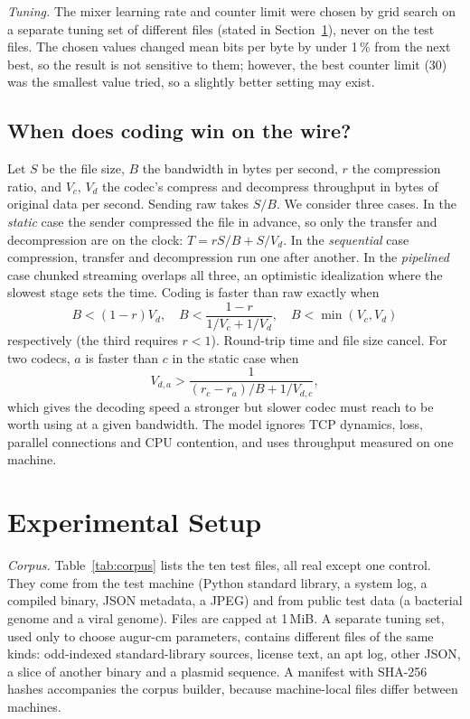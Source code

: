 \documentclass[conference]{IEEEtran}
\newcommand{\cm}{\textsf{augur-cm}}
\begin{document}
\emph{Tuning.} The mixer learning rate and counter limit were chosen by grid search on a separate tuning set of different files (stated in Section~\ref{sec:setup}), never on the test files. The chosen values changed mean bits per byte by under 1\,\% from the next best, so the result is not sensitive to them; however, the best counter limit (30) was the smallest value tried, so a slightly better setting may exist.

\subsection{When does coding win on the wire?}\label{sec:model}
Let $S$ be the file size, $B$ the bandwidth in bytes per second, $r$ the compression ratio, and $V_c$, $V_d$ the codec's compress and decompress throughput in bytes of original data per second. Sending raw takes $S/B$. We consider three cases. In the \emph{static} case the sender compressed the file in advance, so only the transfer and decompression are on the clock: $T=rS/B+S/V_d$. In the \emph{sequential} case compression, transfer and decompression run one after another. In the \emph{pipelined} case chunked streaming overlaps all three, an optimistic idealization where the slowest stage sets the time. Coding is faster than raw exactly when
\begin{equation}
B<(1-r)V_d,\quad B<\frac{1-r}{1/V_c+1/V_d},\quad B<\min(V_c,V_d)
\label{eq:be}
\end{equation}
respectively (the third requires $r<1$). Round-trip time and file size cancel. For two codecs, $a$ is faster than $c$ in the static case when
\begin{equation}
V_{d,a}>\frac{1}{(r_c-r_a)/B+1/V_{d,c}},
\label{eq:need}
\end{equation}
which gives the decoding speed a stronger but slower codec must reach to be worth using at a given bandwidth. The model ignores TCP dynamics, loss, parallel connections and CPU contention, and uses throughput measured on one machine.

\section{Experimental Setup}\label{sec:setup}
\emph{Corpus.} Table~\ref{tab:corpus} lists the ten test files, all real except one control. They come from the test machine (Python standard library, a system log, a compiled binary, JSON metadata, a JPEG) and from public test data (a bacterial genome and a viral genome). Files are capped at 1\,MiB. A separate tuning set, used only to choose \cm{} parameters, contains different files of the same kinds: odd-indexed standard-library sources, license text, an apt log, other JSON, a slice of another binary and a plasmid sequence. A manifest with SHA-256 hashes accompanies the corpus builder, because machine-local files differ between machines.
\end{document}
